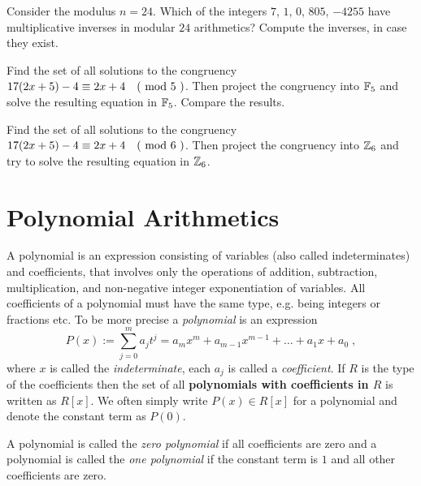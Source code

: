 \begin{exercise}
Consider the modulus $n=24$. Which of the integers $7$, $1$, $0$, $805$, $-4255$ have multiplicative inverses in modular $24$ arithmetics? Compute the inverses, in case they exist.
\end{exercise}
\begin{exercise}
Find the set of all solutions to the congruency $17(2x+5)-4 \equiv 2x+4 \quad \text{( mod } 5 \text{ )}$. Then project the congruency into $\mathbb{F}_5$ and solve the resulting equation in $\mathbb{F}_5$. Compare the results. 
\end{exercise}
\begin{exercise}
Find the set of all solutions to the congruency $17(2x+5)-4 \equiv 2x+4 \quad \text{( mod } 6 \text{ )}$. Then project the congruency into $\mathbb{Z}_6$ and try to solve the resulting equation in $\mathbb{Z}_6$.
\end{exercise}
\section{Polynomial Arithmetics}
A polynomial is an expression consisting of variables (also called indeterminates) and coefficients, that involves only the operations of addition, subtraction, multiplication, and non-negative integer exponentiation of variables. All coefficients of a polynomial must have the same type, e.g. being integers or fractions etc. To be more precise a \textit{polynomial} is an expression
\begin{equation}
P(x) := \sum _{j = 0} ^{m}{a} _{j}{t} ^{j} ={a} _{m}x^m +{a} _{m-1} x^{m-1} + \dots + a_1 x + a_0 \;,
\end{equation}
where $x$ is called the \textit{indeterminate}, each $ a_j$ is called a \textit{coefficient}. If $R$ is the type of the coefficients then the set of all \textbf{polynomials with coefficients in $R$} is written as $R[x]$. We often simply write $ P (x) \in R[x]$ for a polynomial and denote the constant term as $ P(0)$. 

A polynomial is called the \textit{zero polynomial} if all coefficients are zero and a polynomial is called the \textit{one polynomial} if the constant term is $1$ and all other coefficients are zero.

